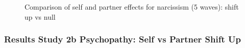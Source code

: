 \documentclass[
  singlecolumn]{article}
\begin{document}
\begin{figure}


\caption{\label{fig-results-narcissism-self-partner-up-long-comparison}Comparison
of self and partner effects for narcissism (5 waves): shift up vs null}

\end{figure}%

\newpage{}

\subsubsection{Results Study 2b Psychopathy: Self vs Partner Shift
Up}\label{results-study-2b-psychopathy-self-vs-partner-shift-up}
\end{document}
